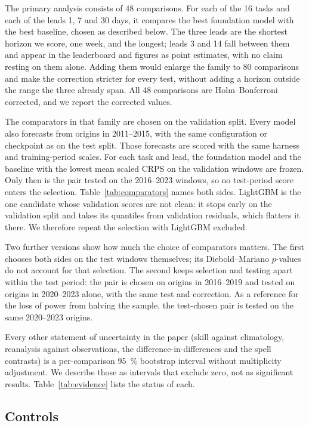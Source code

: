 The primary analysis consists of 48 comparisons. For each of the 16 tasks and each of the leads 1, 7 and 30 days,
it compares the best foundation model with the best baseline, chosen as described below. The three leads are the
shortest horizon we score, one week, and the longest; leads 3 and 14 fall between them and appear in the leaderboard and figures as point estimates, with no
claim resting on them alone. Adding them would enlarge the family to 80 comparisons and make the correction
stricter for every test, without adding a horizon outside the range the three already span. All 48 comparisons are
Holm--Bonferroni corrected, and we report the corrected values.

The comparators in that family are chosen on the validation split. Every model also forecasts from origins in
2011--2015, with the same configuration or checkpoint as on the test split. Those forecasts are scored with the
same harness and training-period scales. For each task and lead, the foundation model and the baseline with the
lowest mean scaled CRPS on the validation windows are frozen. Only then is the pair tested on the 2016--2023
windows, so no test-period score enters the selection. Table~\ref{tab:comparators} names both sides.
LightGBM is the one candidate whose validation scores are not clean: it stops early on the validation split and
takes its quantiles from validation residuals, which flatters it there. We therefore repeat the selection with
LightGBM excluded.

Two further versions show how much the choice of comparators matters. The first chooses both sides on the test
windows themselves; its Diebold--Mariano $p$-values do not account for that selection. The second keeps selection
and testing apart within the test period: the pair is chosen on origins in 2016--2019 and tested on origins in
2020--2023 alone, with the same test and correction. As a reference for the loss of power from halving the
sample, the test-chosen pair is tested on the same 2020--2023 origins.

Every other statement of uncertainty in the paper (skill against climatology,
reanalysis against observations, the difference-in-differences and the spell contrasts) is a per-comparison
\SI{95}{\percent} bootstrap interval without multiplicity adjustment. We describe those as intervals that exclude
zero, not as significant results. Table~\ref{tab:evidence} lists the status of each.

\subsection{Controls}

